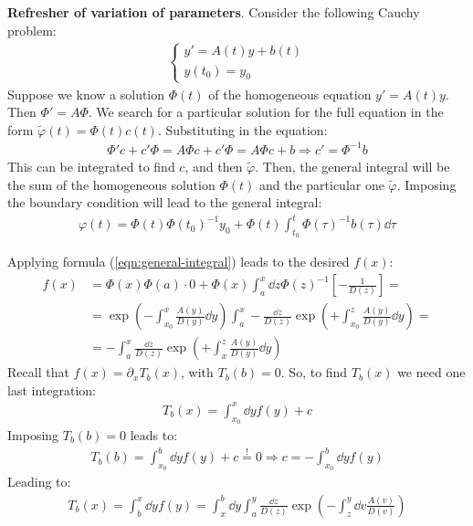 \documentclass[../template.tex]{subfiles}
\begin{document}
\begin{expl}\textbf{Refresher of variation of parameters}. Consider the following Cauchy problem:
    \begin{align*}
        \begin{cases}
            y' = A(t) y + b(t)\\
            y(t_0) = y_0
        \end{cases}
    \end{align*}
    Suppose we know a solution $\Phi(t)$ of the homogeneous equation $y'=A(t)y$. Then $\Phi' = A \Phi$. We search for a particular solution for the full equation in the form $\tilde{\varphi}(t) = \Phi(t) c(t)$. Substituting in the equation:
    \begin{align*}
        \Phi' c + c' \Phi = A \Phi c + c' \Phi = A \Phi c + b \Rightarrow c' = \Phi^{-1} b 
    \end{align*}
    This can be integrated to find $c$, and then $\tilde{\varphi}$. 
    Then, the general integral will be the sum of the homogeneous solution $\Phi(t)$ and the particular one $\tilde{\varphi}$. Imposing the boundary condition will lead to the general integral:
    \begin{align}\label{eqn:general-integral}
        \varphi(t) = \Phi(t) \Phi(t_0)^{-1} y_0 + \Phi(t) \int_{t_0}^t \Phi(\tau)^{-1} b(\tau) \dd{\tau}
    \end{align}
\end{expl}
Applying formula (\ref{eqn:general-integral}) leads to the desired $f(x)$:
\begin{align*}
    f(x) &= \Phi(x) \Phi(a) \cdot 0 + \Phi(x) \int_a^x \dd{z} \Phi(z)^{-1} \left[-\frac{1}{D(z)} \right] =\\
    &= \exp\left(-\int_{x_0}^x \frac{A(y)}{D(y)} \dd{y} \right) \int_a^x -\frac{\dd{z}}{D(z)}  \exp\left(+\int_{x_0}^z \frac{A(y)}{D(y)}\dd{y} \right) =\\
    &= - \int_a^x \frac{\dd{z}}{D(z)} \exp\left(+\int_x^z \frac{A(y)}{D(y)}\dd{y} \right) 
\end{align*}
Recall that $f(x) = \partial_x T_b(x)$, with $T_b(b) = 0$. So, to find $T_b(x)$ we need one last integration:
\begin{align*}
    T_b(x) = \int_{x_0}^x \dd{y} f(y) + c
\end{align*}
Imposing $T_b(b) = 0$ leads to:
\begin{align*}
    T_b(b) = \int_{x_0}^b \dd{y} f(y) + c \overset{!}{=} 0 \Rightarrow c = -\int_{x_0}^b \dd{y} f(y)
\end{align*}
Leading to:
\begin{align}
    T_b(x) =\int_b^x \dd{y} f(y) = \int_x^b \dd{y} \int_a^y \frac{\dd{z}}{D(z)} \exp\left(-\int_z^y \dd{v}\frac{A(v)}{D(v)} \right) 
    \label{eqn:sol1}
\end{align}
\end{document}
